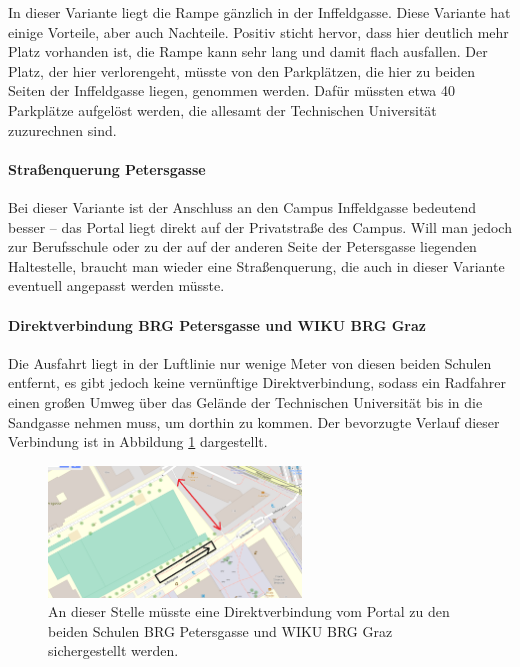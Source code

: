 In dieser Variante liegt die Rampe gänzlich in der Inffeldgasse. Diese Variante hat einige Vorteile, aber auch Nachteile. Positiv sticht hervor, dass hier deutlich mehr Platz vorhanden ist, die Rampe kann sehr lang und damit flach ausfallen. Der Platz, der hier verlorengeht, müsste von den Parkplätzen, die hier zu beiden Seiten der Inffeldgasse liegen, genommen werden. Dafür müssten etwa 40 Parkplätze aufgelöst werden, die allesamt der Technischen Universität zuzurechnen sind.

\paragraph{Straßenquerung Petersgasse}
Bei dieser Variante ist der Anschluss an den Campus Inffeldgasse bedeutend besser -- das Portal liegt direkt auf der Privatstraße des Campus. Will man jedoch zur Berufsschule oder zu der auf der anderen Seite der Petersgasse liegenden Haltestelle, braucht man wieder eine Straßenquerung, die auch in dieser Variante eventuell angepasst werden müsste.

\paragraph{Direktverbindung BRG Petersgasse und WIKU BRG Graz}
Die Ausfahrt liegt in der Luftlinie nur wenige Meter von diesen beiden Schulen entfernt, es gibt jedoch keine vernünftige Direktverbindung, sodass ein Radfahrer einen großen Umweg über das Gelände der Technischen Universität bis in die Sandgasse nehmen muss, um dorthin zu kommen. Der bevorzugte Verlauf dieser Verbindung ist in Abbildung \ref{fig:direktverbindung_brg_petersgasse} dargestellt.

\begin{figure}
    \centering
    \includegraphics[width=0.6\textwidth]{main/bike/tunnel/uni/direktverbindung_brg_petersgasse}
    \caption[Direktverbindung Portal -- BRG Petersgasse]{An dieser Stelle müsste eine Direktverbindung vom Portal zu den beiden Schulen BRG Petersgasse und WIKU BRG Graz sichergestellt werden.}
    \label{fig:direktverbindung_brg_petersgasse}
\end{figure}

